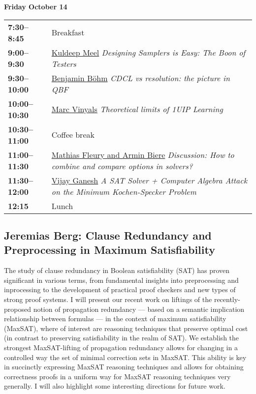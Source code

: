 \documentclass[11pt]{article}
\newcommand{\scheduletablewidth}{5.06in}
\begin{document}
\noindent\begin{minipage}{\textwidth}
\begin{center} {\bf\large Friday October 14} \end{center}
\begin{tabular}{ p{0.9in} p{\scheduletablewidth} }

{\bf 7:30--8:45}  & Breakfast\\

{\bf 9:00--9:30}  & \hyperref[Meel]{Kuldeep Meel}
{\em Designing Samplers is Easy: The Boon of Testers}\\

{\bf 9:30--10:00}  &  \hyperref[Bohm]{Benjamin Böhm}
{\em CDCL vs resolution: the picture in QBF}\\

{\bf 10:00--10:30}  &  \hyperref[Vinyals]{Marc Vinyals}
{\em Theoretical limits of 1UIP Learning}\\

{\bf 10:30--11:00} & Coffee break \\

{\bf 11:00--11:30}  &  \hyperref[FleuryContributed]{Mathias Fleury and Armin Biere}
{\em Discussion: How to combine and compare options in solvers?}\\

{\bf 11:30--12:00}  &  \hyperref[Ganesh]{Vijay Ganesh}
{\em A SAT Solver + Computer Algebra Attack on the Minimum Kochen-Specker Problem}\\

{\bf 12:15%
} & Lunch\\
\end{tabular}
\end{minipage}


\pagebreak


\subsection*{Jeremias Berg: Clause Redundancy and Preprocessing in Maximum Satisfiability}\label{Berg}

The study of clause redundancy in Boolean satisfiability (SAT) has proven significant
in various terms, from fundamental insights into preprocessing and inprocessing to
the development of practical proof checkers and new types of strong proof systems.
I will present our recent work on liftings of the recently-proposed notion of propagation
redundancy --- based on a semantic implication relationship between formulas --- in the
context of maximum satisfiability (MaxSAT), where of interest are reasoning techniques that preserve
optimal cost (in contrast to preserving satisfiability in the realm of SAT).
We establish the strongest MaxSAT-lifting of propagation redundancy allows for changing in a controlled way
the set of minimal correction sets in MaxSAT. This ability is key in succinctly expressing MaxSAT reasoning techniques and allows for obtaining correctness proofs in a uniform way for  MaxSAT reasoning techniques very generally. I will also highlight some interesting directions for future work.
\end{document}
